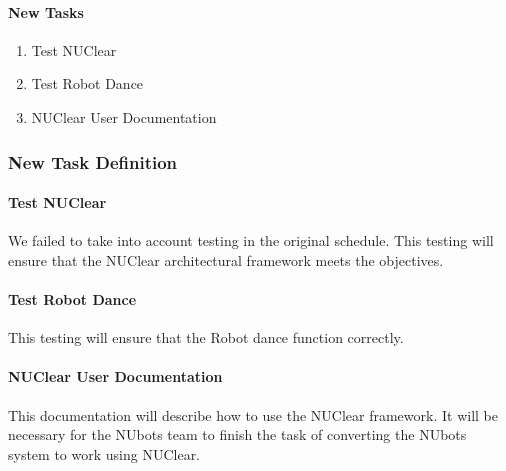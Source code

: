 \documentclass[a4paper]{article}
\begin{document}
				\paragraph{New Tasks}
					\begin{enumerate}
						\item Test NUClear
						\item Test Robot Dance
						\item NUClear User Documentation
					\end{enumerate}
			\subsubsection{New Task Definition}
				\paragraph{Test NUClear}
					We failed to take into account testing in the original schedule. This testing will ensure that the NUClear architectural framework meets the objectives.
				\paragraph{Test Robot Dance}
					This testing will ensure that the Robot dance function correctly.
				\paragraph{NUClear User Documentation}
					This documentation will describe how to use the NUClear framework. It will be necessary for the NUbots team to finish the task of converting the NUbots system to work using NUClear.
					
\end{document}
